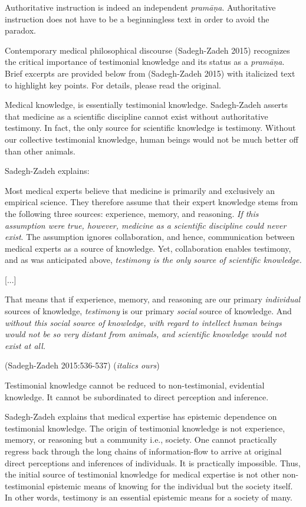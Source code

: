 Authoritative instruction is indeed an independent {{\sl pramāṇa}\relax}.  Authoritative instruction does not have to be a beginningless text in order to avoid the paradox.

Contemporary medical philosophical discourse (Sadegh-Zadeh 2015) recognizes the critical importance of testimonial knowledge and its status as a {\sl pramāṇa}.  Brief excerpts are provided below from (Sadegh-Zadeh 2015) with italicized text to highlight key points. For details, please read the original.
  
Medical knowledge, is essentially testimonial knowledge. Sadegh-Zadeh  asserts that medicine as a scientific discipline cannot exist without authoritative testimony. In fact, the only source for scientific knowledge is testimony. Without our collective testimonial knowledge, human beings would not be much better off than other animals.  

Sadegh-Zadeh explains:
\begin{myquote}
Most medical experts believe that medicine is primarily and exclusively an empirical science.  They therefore assume that their expert knowledge stems from the following three sources: experience, memory, and reasoning. {\sl If this assumption were true, however, medicine as a scientific discipline could never exist}. The assumption ignores collaboration, and hence, communication between medical experts as a source of knowledge. Yet, collaboration enables testimony, and as was anticipated above, {\sl testimony is the only source of scientific knowledge.}

[...]

That means that if experience, memory, and reasoning are our primary {\sl individual} sources of knowledge, {\sl testimony} is our primary {\sl social} source of knowledge.  And {\sl without this social source of knowledge, with regard to intellect human beings would not be so very distant from animals, and scientific knowledge would not exist at all.}

\hfill (Sadegh-Zadeh 2015:536-537) ({\sl italics ours})
\end{myquote}

Testimonial knowledge cannot be reduced to non-testimonial, evidential knowledge. It cannot be subordinated to direct perception and inference.

Sadegh-Zadeh explains that medical expertise has epistemic dependence on testimonial knowledge.  The origin of testimonial knowledge is not experience, memory, or reasoning but a community i.e., society.  One cannot practically regress back through the long chains of information-flow to arrive at original direct perceptions and inferences of individuals.  It is practically impossible.  Thus, the initial source of testimonial knowledge for medical expertise is not other non-testimonial epistemic means of knowing for the individual but the society itself.  In other words, testimony is an essential epistemic means for a society of many.

